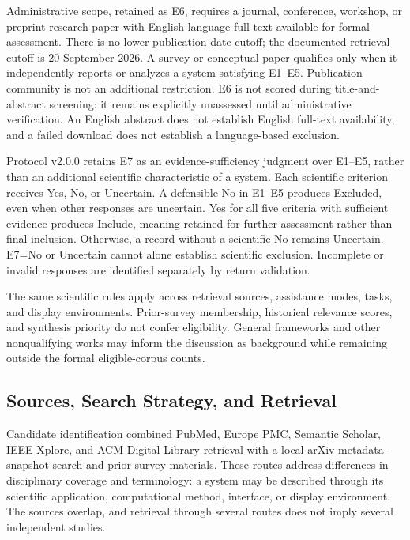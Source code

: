 Administrative scope, retained as E6, requires a journal, conference, workshop, or preprint research paper with English-language full text available for formal assessment. There is no lower publication-date cutoff; the documented retrieval cutoff is 20 September 2026. A survey or conceptual paper qualifies only when it independently reports or analyzes a system satisfying E1--E5. Publication community is not an additional restriction. E6 is not scored during title-and-abstract screening: it remains explicitly unassessed until administrative verification. An English abstract does not establish English full-text availability, and a failed download does not establish a language-based exclusion.

Protocol v2.0.0 retains E7 as an evidence-sufficiency judgment over E1--E5, rather than an additional scientific characteristic of a system. Each scientific criterion receives Yes, No, or Uncertain. A defensible No in E1--E5 produces Excluded, even when other responses are uncertain. Yes for all five criteria with sufficient evidence produces Include, meaning retained for further assessment rather than final inclusion. Otherwise, a record without a scientific No remains Uncertain. E7=No or Uncertain cannot alone establish scientific exclusion. Incomplete or invalid responses are identified separately by return validation.

The same scientific rules apply across retrieval sources, assistance modes, tasks, and display environments. Prior-survey membership, historical relevance scores, and synthesis priority do not confer eligibility. General frameworks and other nonqualifying works may inform the discussion as background while remaining outside the formal eligible-corpus counts.

\subsection{Sources, Search Strategy, and Retrieval}
\label{sec:methodology-search}

Candidate identification combined PubMed, Europe PMC, Semantic Scholar, IEEE Xplore, and ACM Digital Library retrieval with a local arXiv metadata-snapshot search and prior-survey materials. These routes address differences in disciplinary coverage and terminology: a system may be described through its scientific application, computational method, interface, or display environment. The sources overlap, and retrieval through several routes does not imply several independent studies.

